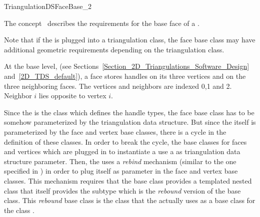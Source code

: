 

\begin{ccRefConcept}{TriangulationDSFaceBase_2}


\ccDefinition
The concept \ccRefName\ describes the requirements for
the base face of a .

Note that if  the  
is plugged  into a triangulation class, 
the face base class may have  additional geometric
requirements depending on the triangulation class.

At the base level, 
(see Sections~\ref{Section_2D_Triangulations_Software_Design} 
and~\ref{2D_TDS_default}),
a  face stores handles
 on  its three vertices  and on  the three neighboring faces.
The vertices and neighbors are indexed 0,1 and 2.
Neighbor $i$ lies opposite to vertex $i$.

Since the  is the class 
which defines the handle
types, the face base class has to be somehow 
parameterized by the triangulation
data structure.  But since the 
itself is parameterized by the face and vertex
base classes, there is a cycle in the definition of these classes.  
In order
to break the cycle, the base classes for faces and vertices
 which are plugged in to instantiate a
use a  as triangulation
data structure parameter. Then, 
the 
 uses a {\it rebind}  mechanism (similar to the one specified in
) in order to plug itself 
as parameter in the face and vertex  base classes. 
This mechanism requires that the base class  provides
a templated nested class  that
itself provides 
 the subtype 
which is the {\it rebound} version of the base class.
 This {\it rebound} base class is  the class
that the   
 actually  uses  as a base class for the class
.



\end{ccRefConcept}
